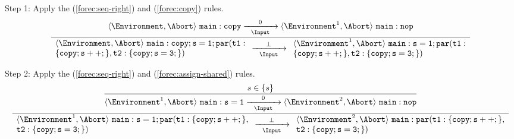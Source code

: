 \noindent
Step 1: Apply the (\ref{forec:seq-right}) and (\ref{forec:copy}) rules. 
\begin{equation*}
	\frac{
			\langle \Environment, \Abort \rangle ~ \mathtt{main: copy}
				\xrightarrow[~~\Input~~]{0} 
			\langle \Environment^1, \Abort \rangle ~ \mathtt{main: nop}
		}{
			\begin{array}{l}
				\langle \Environment, \Abort \rangle ~ \mathtt{main: copy; s=1; par(t1:}		\\
				\mathtt{\{copy; s++;\},t2:\{copy; s=3;\})}										\\
			\end{array}
				\xrightarrow[~~\Input~~]{\bot} 
			\begin{array}{l}
				\langle \Environment^1, \Abort \rangle ~ \mathtt{main: s=1; par(t1:}			\\
				\mathtt{\{copy; s++;\},t2:\{copy; s=3;\})}										\\
			\end{array}
		}
\end{equation*}

\noindent
Step 2: Apply the (\ref{forec:seq-right}) and (\ref{forec:assign-shared}) rules. 
\begin{equation*}
	\frac{
		\dfrac{
				s \in \lbrace s \rbrace
			}{
				\langle \Environment^1, \Abort \rangle ~ \mathtt{main: s=1}
					\xrightarrow[~~\Input~~]{0} 
				\langle \Environment^2, \Abort \rangle ~ \mathtt{main: nop}
			}
		}{
			\begin{array}{l}
				\langle \Environment^1, \Abort \rangle ~ \mathtt{main: s=1; par(t1:\{copy; s++;\},}	\\
				\mathtt{t2:\{copy; s=3;\})}															\\
			\end{array}
				\xrightarrow[~~\Input~~]{\bot} 
			\begin{array}{l}
				\langle \Environment^2, \Abort \rangle ~ \mathtt{main: par(t1:\{copy; s++;\},}		\\
				\mathtt{t2:\{copy; s=3;\})}															\\
			\end{array}
		}
\end{equation*}

